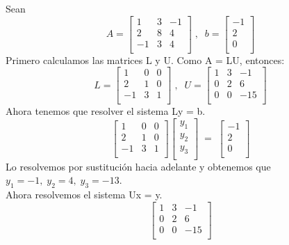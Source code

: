 			\begin{ejemplo}
			Sean
			\[ A = \begin{bmatrix}
			1 & 3 & -1 \\
			2 & 8 & 4 \\
			-1 & 3 & 4 \\
			\end{bmatrix} 
			\; , \; \;
			b = \begin{bmatrix}
			-1 \\
			2 \\
			0 \\
			\end{bmatrix}
			\]
			Primero calculamos las matrices L y U. Como A = LU, entonces:
			\[ L = \begin{bmatrix}
			1 & 0 & 0 \\
			2 & 1 & 0 \\
			-1 & 3 & 1 \\
			\end{bmatrix}
			\; , \; \;
			U = \begin{bmatrix}
			1 & 3 & -1 \\
			0 & 2 & 6 \\
			0 & 0 & -15 \\
			\end{bmatrix}
			\]
			Ahora tenemos que resolver el sistema Ly = b.
			\[ \begin{bmatrix}
			1 & 0 & 0 \\
			2 & 1 & 0 \\
			-1 & 3 & 1 \\
			\end{bmatrix}
			\begin{bmatrix}
			y_1 \\
			y_2 \\
			y_3 \\
			\end{bmatrix}
			\; = \;
			\begin{bmatrix}
			-1 \\
			2 \\
			0 \\
			\end{bmatrix}
			\]
			Lo resolvemos por sustitución hacia adelante y obtenemos que $y_1 = -1, \; y_2 = 4, \; y_3 = -13$.\\
			Ahora resolvemos el sistema Ux = y.
			\[ 
			\begin{bmatrix}
			1 & 3 & -1 \\
			0 & 2 & 6 \\
			0 & 0 & -15 \\

\end{bmatrix}\]
\end{ejemplo}
